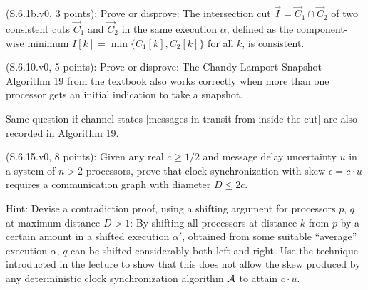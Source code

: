 \begin{Exc}{(S.6.1b.v0, 3 points):}
Prove or disprove: The intersection cut $\vec{I} = \vec{C}_1 \cap \vec{C}_2$
of two consistent cuts $\vec{C}_1$ and $\vec{C}_2$ in the same
execution $\alpha$, defined as the
component-wise minimum $I[k]=\min\{C_1[k],C_2[k]\}$ for all $k$,
is consistent.
\end{Exc}
\begin{Exc}{(S.6.10.v0, 5 points):}
Prove or disprove: The Chandy-Lamport Snapshot Algorithm 19 from
the textbook also works correctly when more than one processor gets
an initial indication to take a snapshot.

Same question if channel states [messages in transit from inside
the cut] are also recorded in Algorithm 19.
\end{Exc}
\begin{Exc}{(S.6.15.v0, 8 points):}
Given any real $c \geq 1/2$ and message delay uncertainty $u$ in a system
of $n>2$ processors, prove that clock
synchronization with skew $\epsilon=c\cdot u$ requires a communication graph
with diameter $D \leq 2c$.

\normalfont
Hint: Devise a contradiction proof, using a shifting argument for
processors $p$, $q$ at maximum distance $D>1$: By shifting all
processors at distance $k$ from $p$ by a certain amount in a
shifted execution $\alpha'$, obtained from some suitable ``average''
execution $\alpha$, $q$ can be shifted considerably both
left and right. Use the technique introducted in the lecture
to show that this does not allow the skew produced by any
deterministic clock synchronization algorithm ${\cal A}$
to attain $c\cdot u$.
\end{Exc}

